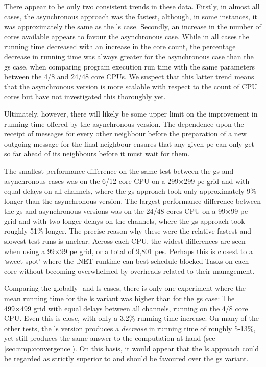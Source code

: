 There appear to be only two consistent trends in these data.  Firstly, in almost all cases, the asynchronous approach was the fastest, although, in some instances, it was approximately the same as the \gls{ls} case.  Secondly, an increase in the number of cores available appears to favour the asynchronous case.  While in all cases the running time decreased with an increase in the core count, the percentage decrease in running time was always greater for the asynchronous case than the \gls{gs} case, when comparing program execution run time with the same parameters between the 4/8 and 24/48 core CPUs.  We suspect that this latter trend means that the asynchronous version is more scalable with respect to the count of CPU cores but have not investigated this thoroughly yet.

Ultimately, however, there will likely be some upper limit on the improvement in running time offered by the asynchronous version.  The dependence upon the receipt of messages for every other neighbour before the preparation of a new outgoing message for the final neighbour ensures that any given \gls{pe} can only get so far ahead of its neighbours before it must wait for them.

The smallest performance difference on the same test between the \gls{gs} and asynchronous cases was on the 6/12 core CPU on a 299×299 \gls{pe} grid and with equal delays on all channels, where the \gls{gs} approach took only approximately 9\% longer than the asynchronous version.  The largest performance difference between the \gls{gs} and asynchronous versions was on the 24/48 cores CPU on a 99×99 \gls{pe} grid and with two longer delays on the channels, where the \gls{gs} approach took roughly 51\% longer.  The precise reason why these were the relative fastest and slowest test runs is unclear.  Across each CPU, the widest differences are seen when using a 99×99 \gls{pe} grid, or a total of 9,801 \glspl{pe}.  Perhaps this is closest to a `sweet spot' where the .NET runtime can best schedule blocked Tasks on each core without becoming overwhelmed by overheads related to their management.

Comparing the globally- and \gls{ls} cases, there is only one experiment where the mean running time for the \gls{ls} variant was higher than for the \gls{gs} case:  The 499×499 grid with equal delays between all channels, running on the 4/8 core CPU.  Even this is close, with only a 3.2\% running time increase.   On many of the other tests, the \gls{ls} version produces a \emph{decrease} in running time of roughly 5-13\%, yet still produces the same answer to the computation at hand (see \autoref{sec:nmp:convergence}).  On this basis, it would appear that the \gls{ls} approach could be regarded as strictly superior to and should be favoured over the \gls{gs} variant.

